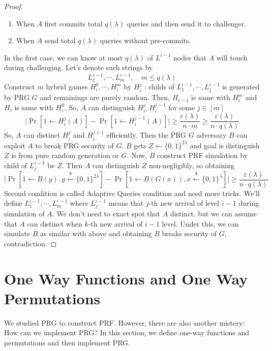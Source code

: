 \documentclass[12pt, a4paper, openany, twoside]{book}
\theoremstyle{definition}
\theoremstyle{remark}
\theoremstyle{plain}
\numberwithin{equation}{section}
\begin{document}
\begin{proof}
\begin{enumerate}
    \item When $A$ first commits total $q(\lambda)$ queries and then send it to challenger. 
    \item When $A$ send total $q(\lambda)$ queries without pre-commits. 
\end{enumerate}
In the first case, we can know at most $q(\lambda)$ of $L^{i-1}$ nodes that $A$ will touch during challenging. 
Let's denote such strings by 
\[L^{i-1}_{1}, \cdots, L^{i-1}_{m}, \quad m \leq q(\lambda)\]
Construct $m$ hybrid games $H_i^0, \cdots, H_i^{m}$ by $H_i^j$ : childs of $L^{i-1}_1, \cdots, L^{i-1}_j$ is generated by PRG $G$ and remainings are purely random. Then, $H_{i-1}$ is same with $H_i^m$ and $H_i$ is same with $H^{0}_i$. 
So, $A$ can distinguish $H_i^j, H_i^{j-1}$ for some $j \in [m]$ 
\[\bigg|\Pr\left[1 \gets H^{j}_i(A)\right] - \Pr\left[1 \gets H^{j-1}_i(A)\right]\bigg| \geq \frac{\varepsilon(\lambda)}{n \cdot m} \geq \frac{\varepsilon(\lambda)}{n \cdot q(\lambda)}\]
So, $A$ can distinct $H_i^j$ and $H_i^{j+1}$ efficiently. Then the PRG $G$ adversary $B$ can exploit $A$ to break PRG security of $G$. 
$B$ gets $Z \gets \{0,1\}^{2\lambda}$ and goal is distinguish $Z$ is from pure random generation or $G$. Now, $B$ construct PRF simulation by child of $L^{i-1}_j$ be $Z$. 
Then $A$ can distinguish $Z$ non-negligibly, so obtaining 
\[\bigg|\Pr[1 \gets B(y), y \xleftarrow{\$} \{0,1\}^{2\lambda}] - \Pr[1 \gets B(G(x)), x \xleftarrow{\$} \{0,1\}^\lambda]\bigg| \geq \frac{\varepsilon(\lambda)}{n \cdot q(\lambda)}\]
Second condition is called Adaptive Queries condition and need more tricks. 
We'll define $L^{i-1}_1, \cdots, L^{i-1}_m$ where $L^{i-1}_j$ means that $j$-th new arrival of level $i-1$ during simulation of $A$. We don't need to exact spot that $A$ distinct, but we can assume that $A$ can distinct when $k$-th new arrival of $i-1$ level. 
Under this, we can simulate $B$ as similar with above and obtaining $B$ breaks security of $G$, contradiction. 

\end{proof}

\section{One Way Functions and One Way Permutations}

We studied PRG to construct PRF. However, there are also another mistery: How can we implement PRG? 
In this section, we define one-way functions and permutations and then implement PRG. 
\end{document}
